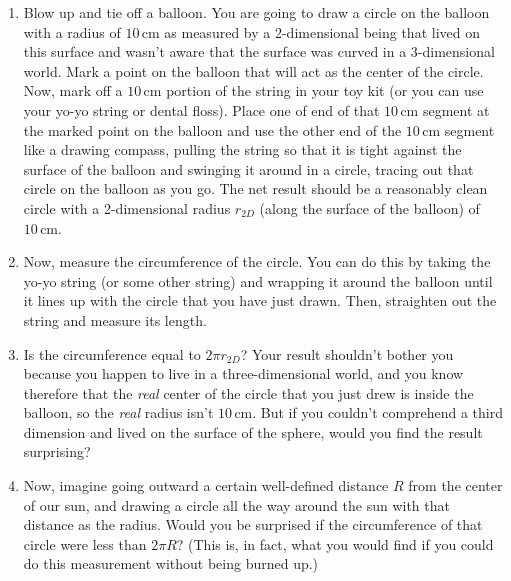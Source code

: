 \begin{exercise}
  \begin{enumerate}

  \item Blow up and tie off a balloon.  You are going to draw a circle
    on the balloon with a radius of $10\,\text{cm}$ as measured by a
    2-dimensional being that lived on this surface and wasn't aware
    that the surface was curved in a 3-dimensional world.  Mark a point
    on the balloon that will act as the center of the circle.  Now,
    mark off a $10\,\text{cm}$ portion of the string in your toy kit
    (or you can use your yo-yo string or dental floss).  Place one
    of end of that $10\,\text{cm}$ segment at the marked point on the
    balloon and use the other end of the $10\,\text{cm}$ segment like a
    drawing compass, pulling the string so that it is tight against the
    surface of the balloon and swinging it around in a circle, tracing
    out that circle on the balloon as you go.  The net result should be
    a reasonably clean circle with a 2-dimensional radius $r_{ 2D}$
    (along the surface of the balloon) of $10\,\text{cm}$.

  \item Now, measure the circumference of the circle.  You can do this
    by taking the yo-yo string (or some other string) and wrapping it
    around the balloon until it lines up with the circle that you have
    just drawn.  Then, straighten out the string and measure its
    length.

  \item Is the circumference equal to $2\pi r_{ 2D}$?  Your result
    shouldn't bother you because you happen to live in a
    three-dimensional world, and you know therefore that the \emph{real} center of the circle that you just drew is inside the
    balloon, so the \emph{real} radius isn't $10\,\text{cm}$.  But if
    you couldn't comprehend a third dimension and lived on the surface
    of the sphere, would you find the result surprising?

  \item Now, imagine going outward a certain well-defined distance $R$
    from the center of our sun, and drawing a circle all the way
    around the sun with that distance as the radius.  Would you be
    surprised if the circumference of that circle were less than $2\pi
    R$?  (This is, in fact, what you would find if you could do this
    measurement without being burned up.)

  
  \end{enumerate}
\end{exercise}



